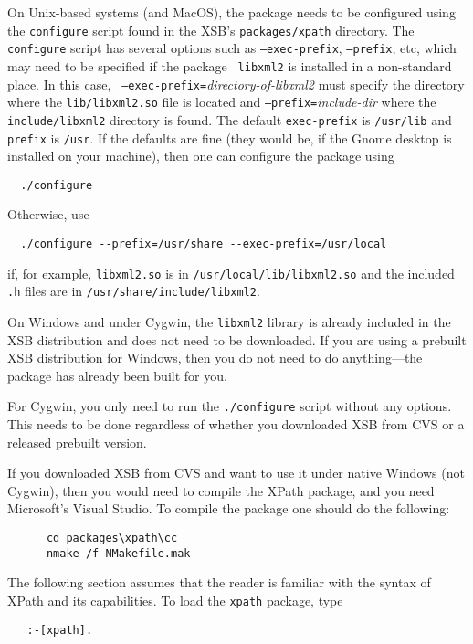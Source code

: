 On Unix-based systems (and MacOS), the package needs to be configured using the
{\tt configure} script found in the XSB's {\tt packages/xpath} directory.
The {\tt configure} script has several options such as {\tt --exec-prefix},
{\tt --prefix}, etc, which may need to be specified if the package {\tt
  libxml2} is installed in a non-standard place. In this case, {\tt
  --exec-prefix=}{\em directory-of-libxml2} must specify the directory where the
{\tt lib/libxml2.so} file is located and {\tt --prefix=}\emph{include-dir} 
where the {\tt include/libxml2} directory is 
found. The default {\tt exec-prefix} is {\tt /usr/lib} and {\tt prefix} is
{\tt /usr}. If the defaults are fine (they would be, if the Gnome desktop
is installed on your machine), then one can configure the package using
\begin{verbatim}
  ./configure 
\end{verbatim}
Otherwise, use
\begin{verbatim}
  ./configure --prefix=/usr/share --exec-prefix=/usr/local
\end{verbatim}
if, for example, {\tt libxml2.so} is in {\tt /usr/local/lib/libxml2.so} and
the included {\tt .h}  files are in {\tt /usr/share/include/libxml2}. 

On Windows and under Cygwin, the {\tt libxml2} library is already included
in the XSB distribution and does not need to be downloaded. If you are
using a prebuilt XSB distribution for Windows, then you do not need to do
anything---the package has already been built for you.

For Cygwin, you only need to run the {\tt ./configure} script without any
options. This needs to be done regardless of whether you downloaded XSB
from CVS or a released prebuilt version. 

If you downloaded XSB from CVS and want to use it under native Windows (not
Cygwin), then you would need to compile the XPath package, and you
need Microsoft's Visual Studio.  To compile the package one should do the
following:
\begin{verbatim}
      cd packages\xpath\cc
      nmake /f NMakefile.mak  
\end{verbatim}


The following section assumes that the reader is familiar with the syntax
of XPath and its capabilities.  To load the {\tt xpath} package, type
\begin{verbatim}
   :-[xpath]. 
\end{verbatim}


